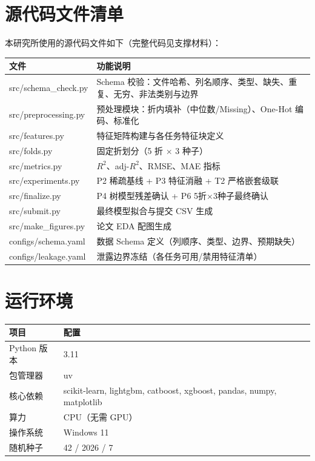 \section{源代码文件清单}

本研究所使用的源代码文件如下（完整代码见支撑材料）：

\begin{table}[H]
\centering
\begin{tabular}{lp{7cm}}
\toprule
\textbf{文件} & \textbf{功能说明} \\
\midrule
src/schema\_check.py & Schema 校验：文件哈希、列名顺序、类型、缺失、重复、无穷、非法类别与边界 \\
src/preprocessing.py & 预处理模块：折内填补（中位数/Missing）、One-Hot 编码、标准化 \\
src/features.py & 特征矩阵构建与各任务特征块定义 \\
src/folds.py & 固定折划分（5 折 $\times$ 3 种子） \\
src/metrics.py & $R^2$、adj-$R^2$、RMSE、MAE 指标 \\
src/experiments.py & P2 稀疏基线 + P3 特征消融 + T2 严格嵌套级联 \\
src/finalize.py & P4 树模型残差确认 + P6 5折$\times$3种子最终确认 \\
src/submit.py & 最终模型拟合与提交 CSV 生成 \\
src/make\_figures.py & 论文 EDA 配图生成 \\
configs/schema.yaml & 数据 Schema 定义（列顺序、类型、边界、预期缺失） \\
configs/leakage.yaml & 泄露边界冻结（各任务可用/禁用特征清单） \\
\bottomrule
\end{tabular}
\end{table}

\section{运行环境}

\begin{table}[H]
\centering
\begin{tabular}{ll}
\toprule
\textbf{项目} & \textbf{配置} \\
\midrule
Python 版本 & 3.11 \\
包管理器 & uv \\
核心依赖 & scikit-learn, lightgbm, catboost, xgboost, pandas, numpy, matplotlib \\
算力 & CPU（无需 GPU） \\
操作系统 & Windows 11 \\
随机种子 & 42 / 2026 / 7 \\
\bottomrule
\end{tabular}
\end{table}

